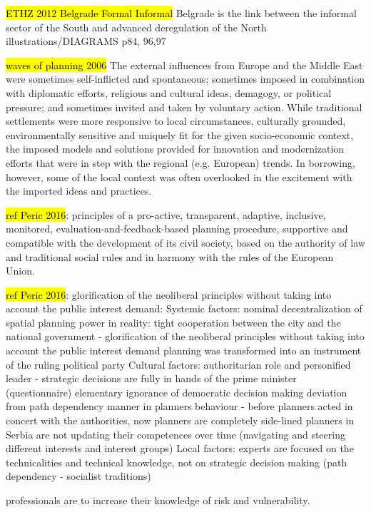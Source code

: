 \documentclass[11pt]{report}
\begin{document}
\hl{ETHZ 2012 Belgrade Formal Informal}
Belgrade is the link between the informal sector of the South and advanced deregulation of the North
illustrations/DIAGRAMS p84, 96,97

 	\hl{waves of planning 2006}
The  external  influences  from Europe  and  the  Middle  East  were  sometimes  self-inflicted  and  spontaneous;  sometimes imposed in combination with diplomatic efforts, religious and cultural ideas, demagogy, or political pressure; and sometimes invited and taken by voluntary action. While traditional settlements were more responsive to local circumstances, culturally grounded, environmentally sensitive and uniquely fit for the given socio-economic context, the imposed models and solutions provided for innovation and modernization efforts that were in step with the regional (e.g. European) trends. In borrowing, however, some of the local context was often overlooked in the excitement with the imported ideas and practices.

\hl{ref Peric 2016}:
principles of a pro-active, transparent, adaptive, inclusive, monitored, evaluation-and-feedback-based planning procedure, supportive and compatible with the development of its civil society, based on the authority of law and traditional social rules and in harmony with the rules of the European Union.

\hl{ref Peric 2016}:
glorification of the neoliberal principles without taking into account the public interest demand:
    Systemic factors:
nominal decentralization of spatial planning power
in reality: tight cooperation between the city and the national government - 
glorification of the neoliberal principles without taking into account the public interest demand
planning was transformed into an instrument of the ruling political party
    Cultural factors:
authoritarian role and personified leader - strategic decisions are fully in hands of the prime minister (questionnaire)
elementary ignorance of democratic decision making
deviation from path dependency manner in planners behaviour -  before planners acted in concert with the authorities, now planners are completely side-lined
planners in Serbia are not updating their competences over time (navigating and steering different interests and interest groups)
    Local factors:
experts are focused on the technicalities and technical knowledge, not on strategic decision making (path dependency - socialist traditions)

professionals are to increase their knowledge of risk and vulnerability.
\end{document}
